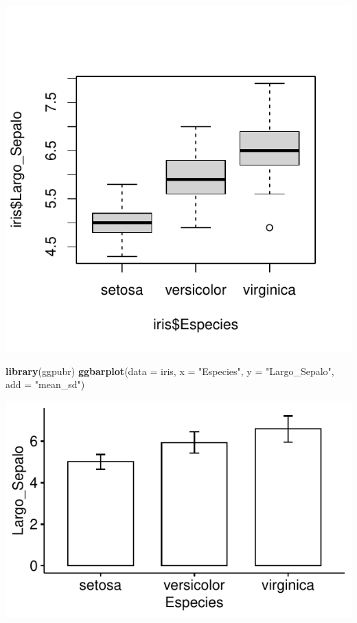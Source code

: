\documentclass[
]{book}
\newenvironment{Shaded}{\begin{snugshade}}{\end{snugshade}}
\newcommand{\AttributeTok}[1]{\textcolor[rgb]{0.13,0.29,0.53}{#1}}
\newcommand{\FunctionTok}[1]{\textcolor[rgb]{0.13,0.29,0.53}{\textbf{#1}}}
\newcommand{\NormalTok}[1]{#1}
\newcommand{\StringTok}[1]{\textcolor[rgb]{0.31,0.60,0.02}{#1}}
\begin{document}
\begin{center}\includegraphics{_main_files/figure-latex/unnamed-chunk-245-1} \end{center}

\begin{Shaded}
\begin{Highlighting}[]
\FunctionTok{library}\NormalTok{(ggpubr)}
\FunctionTok{ggbarplot}\NormalTok{(}\AttributeTok{data =}\NormalTok{ iris, }\AttributeTok{x =} \StringTok{"Especies"}\NormalTok{, }\AttributeTok{y =} \StringTok{"Largo\_Sepalo"}\NormalTok{, }\AttributeTok{add =} \StringTok{"mean\_sd"}\NormalTok{)}
\end{Highlighting}
\end{Shaded}

\begin{center}\includegraphics{_main_files/figure-latex/unnamed-chunk-246-1} \end{center}
\end{document}
